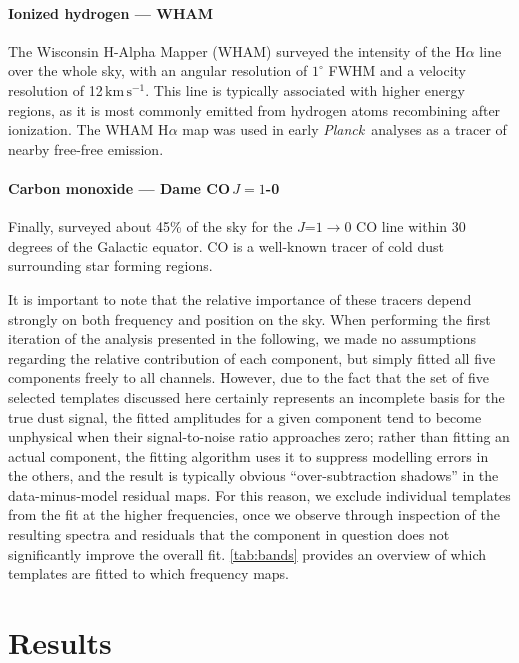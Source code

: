 \documentclass{aa}
\def\Planck{\textit{Planck}}
\begin{document}
\paragraph{Ionized hydrogen --- WHAM}
The Wisconsin H-Alpha Mapper (WHAM) \citep{wham_north:2003,
  wham_south:2010,2016WHAM} surveyed the intensity of the H$\alpha$ line over
the whole sky, with an angular resolution of $1^{\circ}$ FWHM and a velocity
resolution of 12\,$\mathrm{km\,s^{-1}}$. This line is typically associated with higher
energy regions, as it is most commonly emitted from hydrogen atoms
recombining after ionization. The WHAM H$\alpha$ map was used in early
\Planck\ analyses as a tracer of nearby free-free emission.

\paragraph{Carbon monoxide --- Dame CO\,$J=1$-0}
Finally, \citet{dame:2001} surveyed about 45\% of the sky for the
$J$=$1\rightarrow0$ CO line within 30 degrees of the Galactic
equator. CO is a well-known tracer of cold dust surrounding star
forming regions.

It is important to note that the relative importance of these tracers
depend strongly on both frequency and position on the sky. When
performing the first iteration of the analysis presented in the
following, we made no assumptions regarding the relative contribution
of each component, but simply fitted all five components freely to all
channels. However, due to the fact that the set of five selected
templates discussed here certainly represents an incomplete basis for
the true dust signal, the fitted amplitudes for a given component tend
to become unphysical when their signal-to-noise ratio approaches zero;
rather than fitting an actual component, the fitting algorithm uses it
to suppress modelling errors in the others, and the result is
typically obvious ``over-subtraction shadows'' in the data-minus-model
residual maps. For this reason, we exclude individual templates from
the fit at the higher frequencies, once we observe through inspection
of the resulting spectra and residuals that the component in question
does not significantly improve the overall fit. \cref{tab:bands}
provides an overview of which templates are fitted to which frequency
maps.

\section{Results}
\label{sec:results}
\end{document}
